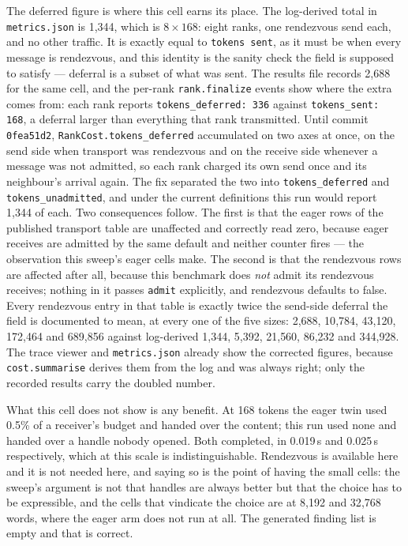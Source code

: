 \documentclass[11pt]{article}
\begin{document}
The deferred figure is where this cell earns its place. The log-derived total in
\texttt{metrics.json} is 1{,}344, which is $8 \times 168$: eight ranks, one
rendezvous send each, and no other traffic. It is exactly equal to \texttt{tokens
sent}, as it must be when every message is rendezvous, and this identity is the
sanity check the field is supposed to satisfy --- deferral is a subset of what was
sent. The results file records 2{,}688 for the same cell, and the per-rank
\texttt{rank.finalize} events show where the extra comes from: each rank reports
\texttt{tokens\_deferred: 336} against \texttt{tokens\_sent: 168}, a deferral larger
than everything that rank transmitted. Until commit \texttt{0fea51d2},
\texttt{RankCost.tokens\_deferred} accumulated on two axes at once, on the send side
when transport was rendezvous and on the receive side whenever a message was not
admitted, so each rank charged its own send once and its neighbour's arrival again.
The fix separated the two into \texttt{tokens\_deferred} and
\texttt{tokens\_unadmitted}, and under the current definitions this run would report
1{,}344 of each. Two consequences follow. The first is that the eager rows of the
published transport table are unaffected and correctly read zero, because eager
receives are admitted by the same default and neither counter fires --- the
observation this sweep's eager cells make. The second is that the rendezvous rows
are affected after all, because this benchmark does \emph{not} admit its rendezvous
receives; nothing in it passes \texttt{admit} explicitly, and rendezvous defaults to
false. Every rendezvous entry in that table is exactly twice the send-side deferral
the field is documented to mean, at every one of the five sizes: 2{,}688, 10{,}784,
43{,}120, 172{,}464 and 689{,}856 against log-derived 1{,}344, 5{,}392, 21{,}560,
86{,}232 and 344{,}928. The trace viewer and \texttt{metrics.json} already show the
corrected figures, because \texttt{cost.summarise} derives them from the log and was
always right; only the recorded results carry the doubled number.

What this cell does not show is any benefit. At 168 tokens the eager twin used 0.5\%
of a receiver's budget and handed over the content; this run used none and handed
over a handle nobody opened. Both completed, in 0.019\,s and 0.025\,s respectively,
which at this scale is indistinguishable. Rendezvous is available here and it is not
needed here, and saying so is the point of having the small cells: the sweep's
argument is not that handles are always better but that the choice has to be
expressible, and the cells that vindicate the choice are at 8{,}192 and 32{,}768
words, where the eager arm does not run at all. The generated finding list is empty
and that is correct.
\end{document}
